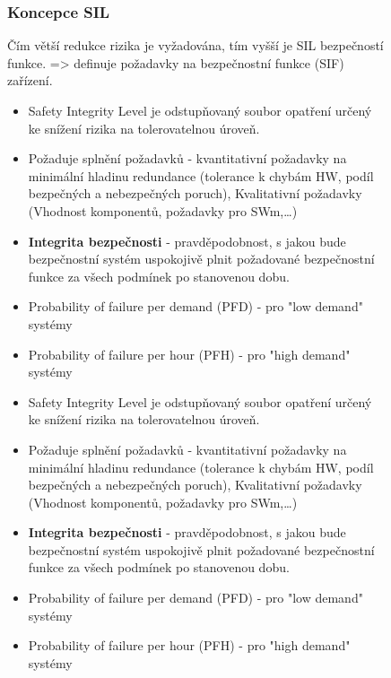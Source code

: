 \begin{figure}[h]
\subsubsection*{Koncepce SIL}
Čím větší redukce rizika je vyžadována, tím vyšší je SIL bezpečností funkce. => definuje požadavky na bezpečnostní funkce (SIF) zařízení.
\begin{itemize}
  \item Safety Integrity Level je odstupňovaný soubor opatření určený ke snížení rizika na tolerovatelnou úroveň.
  \item Požaduje splnění požadavků - kvantitativní požadavky na minimální hladinu redundance (tolerance k chybám HW, podíl bezpečných a nebezpečných poruch), Kvalitativní požadavky (Vhodnost komponentů, požadavky pro SWm,\dots)
  \item \textbf{Integrita bezpečnosti} - pravděpodobnost, s jakou bude bezpečnostní systém uspokojivě plnit požadované bezpečnostní funkce za všech podmínek po stanovenou dobu.
  \item Probability of failure per demand (PFD) - pro "low demand" systémy
  \item Probability of failure per hour (PFH) - pro "high demand" systémy
    \item Safety Integrity Level je odstupňovaný soubor opatření určený ke snížení rizika na tolerovatelnou úroveň.
    \item Požaduje splnění požadavků - kvantitativní požadavky na minimální hladinu redundance (tolerance k chybám HW, podíl bezpečných a nebezpečných poruch), Kvalitativní požadavky (Vhodnost komponentů, požadavky pro SWm,\dots)
    \item \textbf{Integrita bezpečnosti} - pravděpodobnost, s jakou bude bezpečnostní systém uspokojivě plnit požadované bezpečnostní funkce za všech podmínek po stanovenou dobu.
    \item Probability of failure per demand (PFD) - pro "low demand" systémy
    \item Probability of failure per hour (PFH) - pro "high demand" systémy
\end{itemize}


\end{figure}
